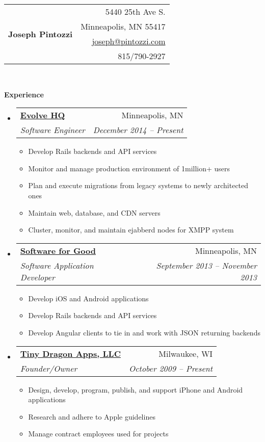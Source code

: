 \documentclass[letterpaper,12pt]{article}
\makeatletter
\newcommand{\resitem}[1]{\item #1 \vspace{-2pt}}
\newcommand{\resheading}[1]{{\large \colorbox{mygrey}{\begin{minipage}{\textwidth}{\textbf{#1 \vphantom{p\^{E}}}}\end{minipage}}}}
\newcommand{\ressubheading}[4]{
\begin{tabular*}{6.5in}{l@{\extracolsep{\fill}}r}
		\textbf{#1} & #2 \\
		\textit{#3} & \textit{#4} \\
\end{tabular*}\vspace{-6pt}}
\makeatother
\begin{document}
\newcommand{\mywebheader}{
\begin{tabular*}{7in}{l@{\extracolsep{\fill}}r}
	\multirow{4}{*}{\huge \bf Joseph Pintozzi} & {5440 25th Ave S.}\\
														& {Minneapolis, MN 55417}\\
														& \href{mailto:joseph@pintozzi.com}{joseph@pintozzi.com}\\
														& {815/790-2927}
	\end{tabular*}
\\
\vspace{0.1in}
}

\mywebheader

\resheading{Experience}
	\begin{itemize}
     \item
			\ressubheading{\href{http://evolvehq.com/}{Evolve HQ}}{Minneapolis, MN}{Software Engineer}{December 2014 -- Present}
				{ \footnotesize
				\begin{itemize}
					\resitem{Develop Rails backends and API services}
					\resitem{Monitor and manage production environment of 1million+ users}
					\resitem{Plan and execute migrations from legacy systems to newly architected ones}
					\resitem{Maintain web, database, and CDN servers}
					\resitem{Cluster, monitor, and maintain ejabberd nodes for XMPP system}
				\end{itemize}
         }
     \item
			\ressubheading{\href{http://softwareforgood.com/}{Software for Good}}{Minneapolis, MN}{Software Application Developer}{September 2013 -- November 2013}
				{ \footnotesize
				\begin{itemize}
					\resitem{Develop iOS and Android applications}
					\resitem{Develop Rails backends and API services}
					\resitem{Develop Angular clients to tie in and work with JSON returning backends}
				\end{itemize}
         }
     \item
			\ressubheading{\href{http://itunes.apple.com/WebObjects/MZStore.woa/wa/viewArtist?id=337595590}{Tiny Dragon Apps, LLC}}{Milwaukee, WI}{Founder/Owner}{October 2009 -- Present}
				{ \footnotesize
				\begin{itemize}
					\resitem{Design, develop, program, publish, and support iPhone and Android applications}
					\resitem{Research and adhere to Apple guidelines}
					\resitem{Manage contract employees used for projects}
				\end{itemize}
}
\end{itemize}
\end{document}
